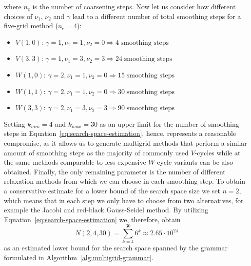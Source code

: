 where $n_c$ is the number of coarsening steps.
Now let us consider how different choices of $\nu_1$, $\nu_2$ and $\gamma$ lead to a different number of total smoothing steps for a five-grid method ($n_c = 4$):
\begin{itemize}
	\item $V(1,0)$: $\gamma = 1, \nu_1 = 1, \nu_2 = 0 \Rightarrow 4 \; \text{smoothing steps}$
	\item $V(3,3)$: $\gamma = 1, \nu_1 = 3, \nu_2 = 3 \Rightarrow 24 \; \text{smoothing steps}$
	\item $W(1,0)$: $\gamma = 2, \nu_1 = 1, \nu_2 = 0 \Rightarrow 15 \; \text{smoothing steps}$
	\item $W(1,1)$: $\gamma = 2, \nu_1 = 1, \nu_2 = 0 \Rightarrow 30 \; \text{smoothing steps}$
	\item $W(3,3)$: $\gamma = 2, \nu_1 = 3, \nu_2 = 3 \Rightarrow 90 \; \text{smoothing steps}$
\end{itemize}
Setting $k_{min} = 4$ and $k_{max} = 30$ as an upper limit for the number of smoothing steps in Equation~\ref{eq:search-space-estimation}, hence, represents a reasonable compromise, as it allows us to generate multigrid methods that perform a similar amount of smoothing steps as the majority of commonly used $V$-cycles while at the same methods comparable to less expensive $W$-cycle variants can be also obtained.
Finally, the only remaining parameter is the number of different relaxation methods from which we can choose in each smoothing step.
To obtain a conservative estimate for a lower bound of the search space size we set $n = 2$, which means that in each step we only have to choose from two alternatives, for example the Jacobi and red-black Gauss-Seidel method.
By utilizing Equation~\eqref{eq:search-space-estimation} we, therefore, obtain 
\begin{equation}
	N(2, 4, 30) = \sum_{k = 4}^{30} 6^k \approx 2.65 \cdot 10^{24}
\end{equation}
as an estimated lower bound for the search space spanned by the grammar formulated in Algorithm~\ref{alg:multigrid-grammar}.
